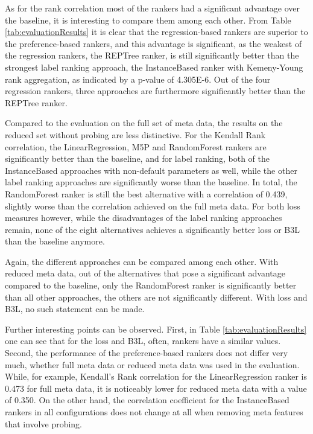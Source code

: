 As for the rank correlation most of the rankers had a significant advantage over the baseline, it is interesting to compare them among each other. From Table \ref{tab:evaluationResults} it is clear that the regression-based rankers are superior to the preference-based rankers, and this advantage is significant, as the weakest of the regression rankers, the REPTree ranker, is still significantly better than the strongest label ranking approach, the InstanceBased ranker with Kemeny-Young rank aggregation, as indicated by a p-value of 4.305E-6. Out of the four regression rankers, three approaches are furthermore significantly better than the REPTree ranker. 

Compared to the evaluation on the full set of meta data, the results on the reduced set without probing are less distinctive. For the Kendall Rank correlation, the LinearRegression, M5P and RandomForest rankers are significantly better than the baseline, and for label ranking, both of the InstanceBased approaches with non-default parameters as well, while the other label ranking approaches are significantly worse than the baseline. In total, the RandomForest ranker is still the best alternative with a correlation of 0.439, slightly worse than the correlation achieved on the full meta data. For both loss measures however, while the disadvantages of the label ranking approaches remain, none of the eight alternatives achieves a significantly better loss or B3L than the baseline anymore.

Again, the different approaches can be compared among each other. With reduced meta data, out of the alternatives that pose a significant advantage compared to the baseline, only the RandomForest ranker is significantly better than all other approaches, the others are not significantly different. With loss and B3L, no such statement can be made.

Further interesting points can be observed. First, in Table \ref{tab:evaluationResults} one can see that for the loss and B3L, often, rankers have a similar values. Second, the performance of the preference-based rankers does not differ very much, whether full meta data or reduced meta data was used in the evaluation. While, for example, Kendall's Rank correlation for the LinearRegression ranker is 0.473 for full meta data, it is noticeably lower for reduced meta data with a value of 0.350. On the other hand, the correlation coefficient for the InstanceBased rankers in all configurations does not change at all when removing meta features that involve probing.

